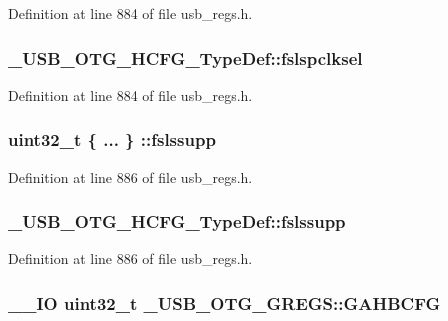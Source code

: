 Definition at line 884 of file usb\-\_\-regs.\-h.

\hypertarget{group___u_s_b___o_t_g___d_r_i_v_e_r_ga7af45d13cc9d2b0911a4519f2285e480}{
\subsubsection[{fslspclksel}]{ \-\_\-\-U\-S\-B\-\_\-\-O\-T\-G\-\_\-\-H\-C\-F\-G\-\_\-\-Type\-Def\-::fslspclksel}}\label{group___u_s_b___o_t_g___d_r_i_v_e_r_ga7af45d13cc9d2b0911a4519f2285e480}


Definition at line 884 of file usb\-\_\-regs.\-h.

\hypertarget{group___u_s_b___o_t_g___d_r_i_v_e_r_ga0b7d87830dbf1e4ec7a18aa665c21da0}{
\subsubsection[{fslssupp}]{\setlength{\rightskip}{0pt plus 5cm}uint32\-\_\-t \{ ... \} \-::fslssupp}}\label{group___u_s_b___o_t_g___d_r_i_v_e_r_ga0b7d87830dbf1e4ec7a18aa665c21da0}


Definition at line 886 of file usb\-\_\-regs.\-h.

\hypertarget{group___u_s_b___o_t_g___d_r_i_v_e_r_ga18cb42f24eb7ab51021d52bbfe6ca281}{
\subsubsection[{fslssupp}]{ \-\_\-\-U\-S\-B\-\_\-\-O\-T\-G\-\_\-\-H\-C\-F\-G\-\_\-\-Type\-Def\-::fslssupp}}\label{group___u_s_b___o_t_g___d_r_i_v_e_r_ga18cb42f24eb7ab51021d52bbfe6ca281}


Definition at line 886 of file usb\-\_\-regs.\-h.

\hypertarget{group___u_s_b___o_t_g___d_r_i_v_e_r_ga06c4430bf0ae0fb15f7bb958aea887fd}{
\subsubsection[{G\-A\-H\-B\-C\-F\-G}]{\setlength{\rightskip}{0pt plus 5cm}\-\_\-\-\_\-\-I\-O {\bf uint32\-\_\-t} \-\_\-\-U\-S\-B\-\_\-\-O\-T\-G\-\_\-\-G\-R\-E\-G\-S\-::\-G\-A\-H\-B\-C\-F\-G}}\label{group___u_s_b___o_t_g___d_r_i_v_e_r_ga06c4430bf0ae0fb15f7bb958aea887fd}


